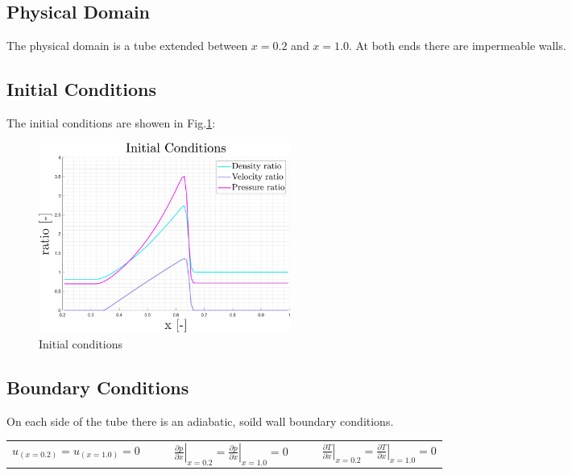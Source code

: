 \documentclass[11pt, a4paper]{article}
\begin{document}
\subsection{Physical Domain}
The physical domain is a tube extended between $x=0.2$ and $x=1.0$. At both ends there are impermeable walls.

\subsection{Initial Conditions}
The initial conditions are showen in Fig.\ref{fig: initial conditions}:
\begin{figure}[H]
    \centering
    \includegraphics[width=0.4\textwidth]{images/Initial Conditions.png}
    \caption{Initial conditions}
    \label{fig: initial conditions}
\end{figure}

\subsection{Boundary Conditions}
On each side of the tube there is an adiabatic, soild wall boundary conditions. 
\begin{table}[H]
    \centering
    \begin{tabular}{cc||ccc||cc}
        $u_{\left(x=0.2\right)}=u_{\left(x=1.0\right)}=0$ &&& $\displaystyle\left.\frac{\partial p}{\partial x}\right|_{x=0.2}=\left.\frac{\partial p}{\partial x}\right|_{x=1.0}=0$ &&& $\displaystyle\left.\frac{\partial T}{\partial x}\right|_{x=0.2}=\left.\frac{\partial T}{\partial x}\right|_{x=1.0}=0$
    \end{tabular}
\end{table}
\end{document}

